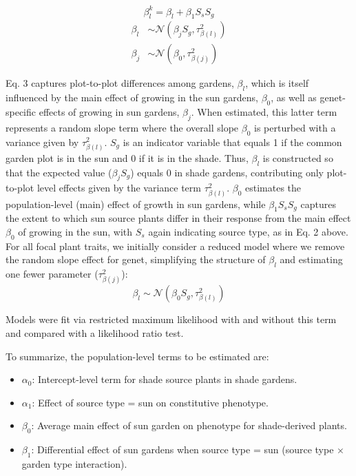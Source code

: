 \documentclass[11pt, oneside]{amsart}
\begin{document}
\begin{equation} \label{eq3}
\beta^{k}_{l} = \beta_{l} + \beta_{1}S_{s}S_{g}
\end{equation}
\begin{align*}
\beta_{l} &\sim \mathcal{N}(\beta_{j}S_{g},\tau^2_{\beta(l)}) \\
\beta_{j} &\sim \mathcal{N}(\beta_{0}, \tau^{2}_{\beta(j)})
\end{align*}

Eq. 3 captures plot-to-plot differences among gardens, $\beta_{l}$, which is itself influenced by the main effect of growing in the sun gardens, $\beta_0$, as well as genet-specific effects of growing in sun gardens, $\beta_{j}$. When estimated, this latter term represents a random slope term where the overall slope $\beta_0$ is perturbed with a variance given by $\tau^{2}_{\beta(l)}$. $S_g$ is an indicator variable that equals 1 if the common garden plot is in the sun and 0 if it is in the shade. Thus, $\beta_l$ is constructed so that the expected value ($\beta_{j}S_{g}$) equals 0 in shade gardens, contributing only plot-to-plot level effects given by the variance term $\tau^2_{\beta(l)}$. $\beta_0$ estimates the population-level (main) effect of growth in sun gardens, while $\beta_{1}S_{s}S_{g}$ captures the extent to which sun source plants differ in their response from the main effect $\beta_0$ of growing in the sun, with $S_s$ again indicating source type, as in Eq. 2 above. For all focal plant traits, we initially consider a reduced model where we remove the random slope effect for genet, simplifying the structure of $\beta_{l}$ and estimating one fewer parameter ($\tau^2_{\beta(j)}$):
$$\beta_{l} \sim \mathcal{N}(\beta_0S_{g},\tau^2_{\beta(l)})$$

Models were fit via restricted maximum likelihood with and without this term and compared with a likelihood ratio test.

To summarize, the population-level terms to be estimated are:
\begin{itemize}
\item $\alpha_0$: Intercept-level term for shade source plants in shade gardens.
\item $\alpha_1$: Effect of source type = sun on constitutive phenotype.
\item $\beta_0$: Average main effect of sun garden on phenotype for shade-derived plants.
\item $\beta_1$: Differential effect of sun gardens when source type = sun (source type $\times$ garden type interaction).
\end{itemize}
\end{document}
